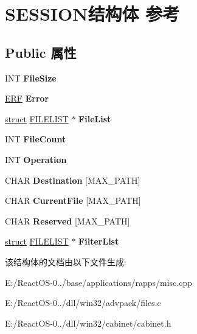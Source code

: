\hypertarget{struct_s_e_s_s_i_o_n}{}\section{S\+E\+S\+S\+I\+O\+N结构体 参考}
\label{struct_s_e_s_s_i_o_n}
\subsection*{Public 属性}
\begin{DoxyCompactItemize}
\item 
\mbox{\label{struct_s_e_s_s_i_o_n_a29ff3e3fca5b9c9724d25bff2ced8273}} 
I\+NT {\bfseries File\+Size}
\item 
\mbox{\label{struct_s_e_s_s_i_o_n_a23bd2d3e8a249b09a8406af2cfa09261}} 
\hyperlink{struct_e_r_f}{E\+RF} {\bfseries Error}
\item 
\mbox{\label{struct_s_e_s_s_i_o_n_acb57ec31b23ea79cda60724feeac27ea}} 
\hyperlink{interfacestruct}{struct} \hyperlink{struct_f_i_l_e_l_i_s_t}{F\+I\+L\+E\+L\+I\+ST} $\ast$ {\bfseries File\+List}
\item 
\mbox{\label{struct_s_e_s_s_i_o_n_acf5c4628aa10b4f6ba3d33e179c4a808}} 
I\+NT {\bfseries File\+Count}
\item 
\mbox{\label{struct_s_e_s_s_i_o_n_a18512f8a186d19008f5aca9e32d72a92}} 
I\+NT {\bfseries Operation}
\item 
\mbox{\label{struct_s_e_s_s_i_o_n_acf8b08c54fa9e1486953b5398872923e}} 
C\+H\+AR {\bfseries Destination} \mbox{[}M\+A\+X\+\_\+\+P\+A\+TH\mbox{]}
\item 
\mbox{\label{struct_s_e_s_s_i_o_n_a2dac6392b5c30133ecafeabee947f300}} 
C\+H\+AR {\bfseries Current\+File} \mbox{[}M\+A\+X\+\_\+\+P\+A\+TH\mbox{]}
\item 
\mbox{\label{struct_s_e_s_s_i_o_n_af003bc4ca8e3f6455c7b2fcf2851ee65}} 
C\+H\+AR {\bfseries Reserved} \mbox{[}M\+A\+X\+\_\+\+P\+A\+TH\mbox{]}
\item 
\mbox{\label{struct_s_e_s_s_i_o_n_a03fe1afd440252f93edd1e7880ca19cf}} 
\hyperlink{interfacestruct}{struct} \hyperlink{struct_f_i_l_e_l_i_s_t}{F\+I\+L\+E\+L\+I\+ST} $\ast$ {\bfseries Filter\+List}
\end{DoxyCompactItemize}


该结构体的文档由以下文件生成\+:\begin{DoxyCompactItemize}
\item 
E\+:/\+React\+O\+S-\/0../base/applications/rapps/misc.\+cpp\item 
E\+:/\+React\+O\+S-\/0../dll/win32/advpack/files.\+c\item 
E\+:/\+React\+O\+S-\/0../dll/win32/cabinet/cabinet.\+h\end{DoxyCompactItemize}

